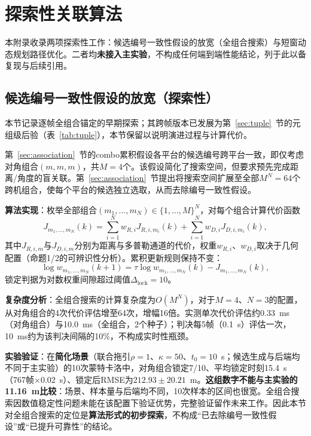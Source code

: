 \documentclass[UTF8,a4paper,zihao=-4]{ctexart}
\begin{document}
\section{探索性关联算法}\label{sup:exploratory}

本附录收录两项探索性工作：候选编号一致性假设的放宽（全组合搜索）与短窗动态规划路径优化。二者均\textbf{未接入主实验}，不构成任何端到端性能结论，列于此以备复现与后续引用。

\subsection{候选编号一致性假设的放宽（探索性）}

本节记录逐帧全组合锚定的早期探索；其跨帧版本已发展为第~\ref{sec:tuple}~节的元组级后验（表~\ref{tab:tuple}），本节保留以说明演进过程与计算代价。

第~\ref{sec:association}~节的combo累积假设各平台的候选编号跨平台一致，即仅考虑对角组合\((m,m,m)\)，共\(M=4\)个。该假设简化了搜索空间，但要求预先完成距离/角度的盲关联。第~\ref{sec:association}~节提出将搜索空间扩展至全部\(M^N=64\)个跨机组合，使每个平台的候选独立选取，从而去除编号一致性假设。

\textbf{算法实现}：枚举全部组合\((m_1,\ldots,m_N)\in\{1,\ldots,M\}^N\)，对每个组合计算代价函数
\begin{equation}
J_{m_1,\ldots,m_N}(k) = \sum_{i=1}^N w_{R,i} J_{R,i,m_i}(k) + \sum_{i=1}^N w_{D,i} J_{D,i,m_i}(k),
\end{equation}
其中\(J_{R,i,m}\)与\(J_{D,i,m}\)分别为距离与多普勒通道的代价，权重\(w_{R,i}\)、\(w_{D,i}\)取决于几何配置（命题1/2的可辨识性分析）。累积更新规则保持不变：
\begin{equation}
\log w_{m_1,\ldots,m_N}(k+1) = \tau \log w_{m_1,\ldots,m_N}(k) - J_{m_1,\ldots,m_N}(k),
\end{equation}
锁定判据为对数权重间隙超过阈值\(\Delta_{\text{lock}}=10\)。

\textbf{复杂度分析}：全组合搜索的计算复杂度为\(O(M^N)\)，对于\(M=4\)、\(N=3\)的配置，从对角组合的4次代价评估增至64次，增幅16倍。实测单次代价评估约0.33~ms（对角组合）与10.0~ms（全组合，2个种子）；判决每5帧（0.1~s）评估一次，10~ms约为该判决间隔的10\%，不构成实时性瓶颈。

\textbf{实验验证}：在\textbf{简化场景}（联合拖引\(\rho=1\)、\(\kappa=50\)、\(t_0=10\)~s；候选生成与后端均不同于主实验）的10次蒙特卡洛中，对角组合锁定7/10、平均锁定时刻15.4~s（767帧$\times$0.02~s）、锁定后RMSE为\(212.93\pm 20.21\)~m。\textbf{这组数字不能与主实验的11.16~m比较}：场景、样本量与后端均不同，10次样本的区间也很宽。全组合搜索因数值稳定性问题未能在该配置下验证优势，完整验证留作未来工作。因此本节对全组合搜索的定位是\textbf{算法形式的初步探索}，不构成“已去除编号一致性假设”或“已提升可靠性”的结论。
\end{document}
